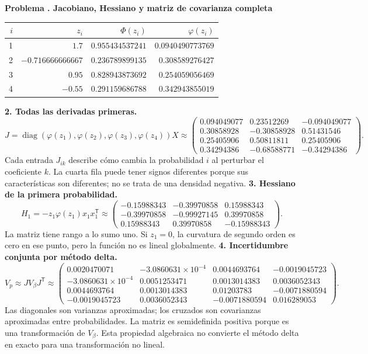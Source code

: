 \documentclass[11pt,a4paper]{article}
\newcommand{\T}{^{\mathsf T}}
\DeclareMathOperator{\diag}{diag}
\theoremstyle{definition}
\newcounter{problema}
\newenvironment{resuelto}[1]{\refstepcounter{problema}\par\medskip\Needspace{6\baselineskip}\textbf{Problema \theproblema. #1}\par}{\par\medskip}
\begin{document}
\begin{resuelto}{Jacobiano, Hessiano y matriz de covarianza completa}
\begin{center}\small\begin{tabular}{rrrr}
\toprule
$i$&$z_i$&$\Phi(z_i)$&$\varphi(z_i)$\\
\midrule
1&$1.7$&$0.955434537241$&$0.0940490773769$\\
2&$-0.716666666667$&$0.236789899135$&$0.308589276427$\\
3&$0.95$&$0.828943873692$&$0.254059056469$\\
4&$-0.55$&$0.291159686788$&$0.342943855019$\\
\bottomrule\end{tabular}\end{center}
\textbf{2. Todas las derivadas primeras.}
\[
J=\diag(\varphi(z_1),\varphi(z_2),\varphi(z_3),\varphi(z_4))X\approx\begin{pmatrix}0.094049077&0.23512269&-0.094049077\\0.30858928&-0.30858928&0.51431546\\0.25405906&0.50811811&0.25405906\\0.34294386&-0.68588771&-0.34294386\end{pmatrix}.
\]
Cada entrada $J_{ik}$ describe cómo cambia la probabilidad $i$ al perturbar el coeficiente $k$. La cuarta fila puede tener signos diferentes porque sus características son diferentes; no se trata de una densidad negativa.
\textbf{3. Hessiano de la primera probabilidad.}
\[
H_1=-z_1\varphi(z_1)x_1x_1\T\approx\begin{pmatrix}-0.15988343&-0.39970858&0.15988343\\-0.39970858&-0.99927145&0.39970858\\0.15988343&0.39970858&-0.15988343\end{pmatrix}.
\]
La matriz tiene rango a lo sumo uno. Si $z_1=0$, la curvatura de segundo orden es cero en ese punto, pero la función no es lineal globalmente.
\textbf{4. Incertidumbre conjunta por método delta.}
\[
V_p\approx JV_\beta J\T\approx\begin{pmatrix}0.0020470071&-3.0860631\times10^{-4}&0.0044693764&-0.0019045723\\-3.0860631\times10^{-4}&0.0051253471&0.0013014383&0.0036052343\\0.0044693764&0.0013014383&0.01203783&-0.0071880594\\-0.0019045723&0.0036052343&-0.0071880594&0.016289053\end{pmatrix}.
\]
Las diagonales son varianzas aproximadas; los cruzados son covarianzas aproximadas entre probabilidades. La matriz es semidefinida positiva porque es una transformación de $V_\beta$. Esta propiedad algebraica no convierte el método delta en exacto para una transformación no lineal.

\end{resuelto}
\end{document}
